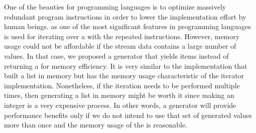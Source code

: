 \begin{itemize}
One of the beauties for programming languages is to optimize massively redundant program instructions in order to lower the implementation effort by human beings. \while as one of the most significant features in programming languages is used for iterating over a \lst with the repeated instructions. However, memory usage could not be affordable if the stream data contains a large number of values. In that case, we proposed a generator that yields items instead of returning a \lst for memory efficiency. It is very similar to the implementation that built a list in memory but has the memory usage characteristic of the iterator implementation. Nonetheless, if the iteration needs to be performed multiple times, then generating a list in memory might be worth it since making an integer is a very expensive process. In other words, a generator will provide performance benefits only if we do not intend to use that set of generated values more than once and the memory usage of the \lst is reasonable.
\end{itemize}

